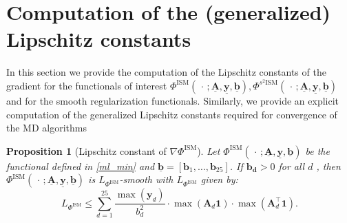 \documentclass[letterpaper]{article}
\newcommand{\x}{\mathbf{x}}
\newcommand{\prox}{\mathrm{prox}}
\newtheorem{proposition}{Proposition}
\begin{document}


\section{Computation of the (generalized) Lipschitz constants}

In this section we provide the computation of the Lipschitz constants of the gradient for the functionals of interest $\Phi^{\text{ISM}}(\,\cdot\,; \underline{\mathbf{A}}, \underline{\mathbf{y}}, 
\underline{\mathbf{b}}), \Phi^{\text{$s^2$ISM}}(\,\cdot\,; \underline{\mathbf{A}}, \underline{\mathbf{y}}, 
\underline{\mathbf{b}})$ and for the smooth regularization functionals. Similarly, we provide an explicit computation of the generalized Lipschitz constants required for convergence of the MD algorithms

\begin{proposition}[Lipschitz constant of $ \nabla \Phi^{\text{ISM}}$]
\label{KL_L} 
Let $\Phi^{\text{ISM}}(\,\cdot\,; \underline{\mathbf{A}}, \underline{\mathbf{y}}, 
\underline{\mathbf{b}})$ be  the functional defined in \eqref{ml_min} and $\underline{\mathbf{b}} = [ \mathbf{b}_1, \dots, \mathbf{b}_{25}]$. If $\mathbf{b_d} > 0$ for all $d$ , then $\Phi^{\text{ISM}}(\,\cdot\,; \underline{\mathbf{A}}, \underline{\mathbf{y}}, 
\underline{\mathbf{b}})$ is $L_{\Phi^{\text{ISM}}}$-smooth with $L_{\Phi^{\text{ISM}}}$ given by:
\begin{equation} \label{eq:L_ISM}
    L_{\Phi^{\text{ISM}}} \leq \sum_{d=1}^{25} \frac{\max(\mathbf{y}_d)}{b_d^2} \cdot 
    \max(\mathbf{A}_d \mathbf{1}) \cdot \max(\mathbf{A}_d^\top \mathbf{1}).
\end{equation}
\end{proposition}
\end{document}
